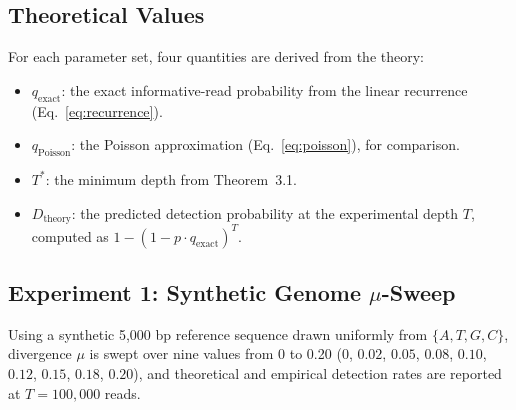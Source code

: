 \documentclass[12pt]{article}
\theoremstyle{definition}
\theoremstyle{plain}
\begin{document}
\subsection{Theoretical Values}

For each parameter set, four quantities are derived from the theory:
\begin{itemize}
  \item $q_{\mathrm{exact}}$: the exact informative-read probability from the
  linear recurrence (Eq.~\eqref{eq:recurrence}).
  \item $q_{\mathrm{Poisson}}$: the Poisson approximation
  (Eq.~\eqref{eq:poisson}), for comparison.
  \item $T^{*}$: the minimum depth from Theorem~3.1.
  \item $D_{\mathrm{theory}}$: the predicted detection probability at the
  experimental depth $T$, computed as $1-(1-p\cdot q_{\mathrm{exact}})^{T}$.
\end{itemize}

\subsection{Experiment 1: Synthetic Genome $\mu$-Sweep}

Using a synthetic 5,000 bp reference sequence drawn uniformly from
$\{A,T,G,C\}$, divergence $\mu$ is swept over nine values from 0 to 0.20
($0$, $0.02$, $0.05$, $0.08$, $0.10$, $0.12$, $0.15$, $0.18$, $0.20$), and
theoretical and empirical detection rates are reported at $T=100{,}000$
reads.
\end{document}
